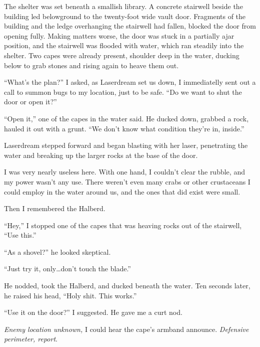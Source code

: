 The shelter was set beneath a smallish library.  A concrete stairwell beside the building led belowground to the twenty-foot wide vault door.  Fragments of the building and the ledge overhanging the stairwell had fallen, blocked the door from opening fully.  Making matters worse, the door was stuck in a partially ajar position, and the stairwell was flooded with water, which ran steadily into the shelter.  Two capes were already present, shoulder deep in the water, ducking below to grab stones and rising again to heave them out.



``What's the plan?'' I asked, as Laserdream set us down, I immediatelly sent out a call to summon bugs to my location, just to be safe.  ``Do we want to shut the door or open it?''



``Open it,'' one of the capes in the water said.  He ducked down, grabbed a rock, hauled it out with a grunt.  ``We don't know what condition they're in, inside.''



Laserdream stepped forward and began blasting with her laser, penetrating the water and breaking up the larger rocks at the base of the door.



I was very nearly useless here.  With one hand, I couldn't clear the rubble, and my power wasn't any use.  There weren't even many crabs or other crustaceans I could employ in the water around us, and the ones that did exist were small.



Then I remembered the Halberd.



``Hey,'' I stopped one of the capes that was heaving rocks out of the stairwell, ``Use this.''



``As a shovel?'' he looked skeptical.



``Just try it, only\ldots don't touch the blade.''



He nodded, took the Halberd, and ducked beneath the water.  Ten seconds later, he raised his head, ``Holy shit.  This works.''



``Use it on the door?'' I suggested.  He gave me a curt nod.



\emph{Enemy location unknown, }I could hear the cape's armband announce.  \emph{Defensive perimeter, report}.



